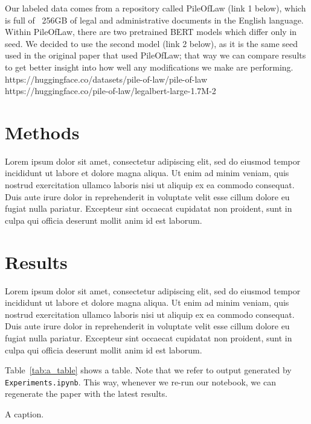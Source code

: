 \documentclass[11pt,a4paper]{article}
\begin{document}
Our labeled data comes from a repository called PileOfLaw (link 1 below), which is full of ~256GB of legal and administrative documents in the English language.
Within PileOfLaw, there are two pretrained BERT models which differ only in seed. We decided to use the second model (link 2 below), as it is the same seed used in the original paper that used PileOfLaw; that way we can compare results to get better insight into how well any modifications we make are performing.
https://huggingface.co/datasets/pile-of-law/pile-of-law
https://huggingface.co/pile-of-law/legalbert-large-1.7M-2


\section{Methods}

Lorem ipsum dolor sit amet, consectetur adipiscing elit, sed do eiusmod tempor incididunt ut labore et dolore magna aliqua. Ut enim ad minim veniam, quis nostrud exercitation ullamco laboris nisi ut aliquip ex ea commodo consequat. Duis aute irure dolor in reprehenderit in voluptate velit esse cillum dolore eu fugiat nulla pariatur. Excepteur sint occaecat cupidatat non proident, sunt in culpa qui officia deserunt mollit anim id est laborum.



\section{Results}

Lorem ipsum dolor sit amet, consectetur adipiscing elit, sed do eiusmod tempor incididunt ut labore et dolore magna aliqua. Ut enim ad minim veniam, quis nostrud exercitation ullamco laboris nisi ut aliquip ex ea commodo consequat. Duis aute irure dolor in reprehenderit in voluptate velit esse cillum dolore eu fugiat nulla pariatur. Excepteur sint occaecat cupidatat non proident, sunt in culpa qui officia deserunt mollit anim id est laborum.


Table~\ref{tab:a_table} shows a table. Note that we refer to output generated by \texttt{Experiments.ipynb}. This way, whenever we re-run our notebook, we can regenerate the paper with the latest results.

\begin{table}[ht]
\centering

\caption{\label{tab:a_table} A caption. }
\end{table}
\end{document}
